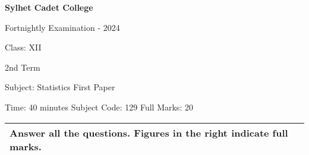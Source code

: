 \documentclass[10pt]{article}
\begin{document}
\vspace{0.5in}


\begin{center}
  \bfseries\large
  Sylhet Cadet College

\normalsize
Fortnightly Examination - 2024

  Class: XII
  
  2nd Term

  Subject: Statistics First Paper

  Time: 40 minutes \qquad \qquad  \qquad \qquad Subject Code: 129  \qquad  \qquad \qquad  \qquad Full Marks: 20

\end{center}

\noindent
\begin{tabular}{p{\dimexpr\linewidth-2\tabcolsep}}
  \textbf{Answer all the questions. Figures in the right indicate full marks.}\\
  \hline
\end{tabular}
\end{document}
